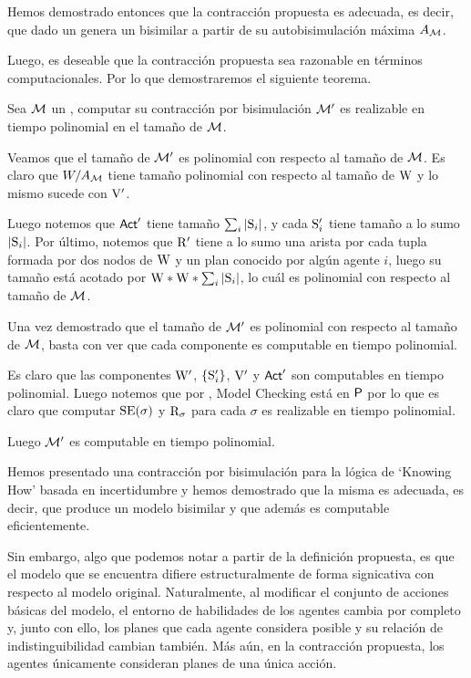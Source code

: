 Hemos demostrado entonces que la contracción propuesta es adecuada, es decir, que dado un \ults genera un \ults bisimilar a partir de su 
autobisimulación máxima $A_\modults$.

Luego, es deseable que la contracción propuesta sea razonable en términos computacionales. Por lo que demostraremos el siguiente teorema.


\begin{teorema}
    Sea $\modults$ un \ults, computar su contracción por bisimulación $\modults'$ es realizable en tiempo polinomial en el 
    tamaño de $\modults$.
\end{teorema}

\begin{demostracion}
    Veamos que el tamaño de $\modults'$ es polinomial con respecto al tamaño de $\modults$. Es claro que $W/A_\modults$ tiene tamaño polinomial con 
    respecto al tamaño de $\W$ y lo mismo sucede con $\V'$. 

    Luego notemos que $\ACT'$ tiene tamaño $\sum_{i} |\S_i|$, y cada $\S_i'$ tiene tamaño a lo sumo $|\S_i|$. Por último, notemos que $\R'$ tiene a lo 
    sumo una arista por cada tupla formada por dos nodos de $\W$ y un plan conocido por algún agente $i$, luego su tamaño está acotado por 
    $\W * \W * \sum_{i}|\S_i|$, lo cuál es polinomial con respecto al tamaño de $\modults$.

    Una vez demostrado que el tamaño de $\modults'$ es polinomial con respecto al tamaño de $\modults$, basta con ver que cada componente es computable en 
    tiempo polinomial. 

    Es claro que las componentes $\W'$, $\{\S_i'\}$, $\V'$ y $\ACT'$ son computables en tiempo polinomial. Luego notemos que por 
    , Model Checking está en $\Poly$ por lo que es claro que computar $\sexec(\sigma)$ y $\R_\sigma$
    para cada $\sigma$ es realizable en tiempo polinomial.

    Luego $\modults'$ es computable en tiempo polinomial.
\end{demostracion}

Hemos presentado una contracción por bisimulación para la lógica de `Knowing How' basada en incertidumbre y hemos demostrado que 
la misma es adecuada, es decir, que produce un modelo bisimilar y que además es computable eficientemente.

Sin embargo, algo que podemos notar a partir de la definición propuesta, es que el modelo que se encuentra difiere estructuralmente de 
forma signicativa con respecto al modelo original. 
Naturalmente, al modificar el conjunto de acciones básicas del modelo, el entorno de habilidades de los agentes cambia por completo y, junto con ello, 
los planes que cada agente considera posible y su relación de indistinguibilidad cambian también. Más aún, en la contracción propuesta, los agentes 
únicamente consideran planes de una única acción.

